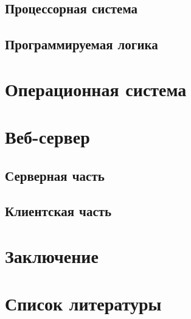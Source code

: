 \documentclass[a4paper, 14pt]{extarticle}
\begin{document}
    \subsection{Процессорная система}
    
    \subsection{Программируемая логика}
    
    \newpage

\section{Операционная система}
    
    \newpage

\section{Веб-сервер}
    
    \subsection{Серверная часть}
    
    \subsection{Клиентская часть}
    
    \newpage

\section*{Заключение}
    
    \newpage

\section*{Список литературы}
\end{document}
